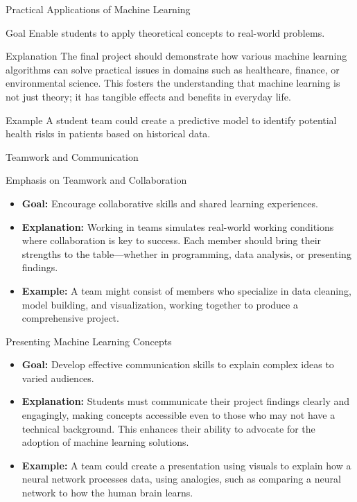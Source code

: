 \documentclass[aspectratio=169]{beamer}
\begin{document}
\begin{frame}[fragile]{Practical Applications of Machine Learning}
    \begin{block}{Goal}
        Enable students to apply theoretical concepts to real-world problems.
    \end{block}
    \begin{block}{Explanation}
        The final project should demonstrate how various machine learning algorithms can solve practical issues in domains such as healthcare, finance, or environmental science. 
        This fosters the understanding that machine learning is not just theory; it has tangible effects and benefits in everyday life.
    \end{block}
    \begin{block}{Example}
        A student team could create a predictive model to identify potential health risks in patients based on historical data.
    \end{block}
\end{frame}

\begin{frame}[fragile]{Teamwork and Communication}
    \begin{block}{Emphasis on Teamwork and Collaboration}
        \begin{itemize}
            \item \textbf{Goal:} Encourage collaborative skills and shared learning experiences.
            \item \textbf{Explanation:} Working in teams simulates real-world working conditions where collaboration is key to success. Each member should bring their strengths to the table—whether in programming, data analysis, or presenting findings.
            \item \textbf{Example:} A team might consist of members who specialize in data cleaning, model building, and visualization, working together to produce a comprehensive project.
        \end{itemize}
    \end{block}
    
    \begin{block}{Presenting Machine Learning Concepts}
        \begin{itemize}
            \item \textbf{Goal:} Develop effective communication skills to explain complex ideas to varied audiences.
            \item \textbf{Explanation:} Students must communicate their project findings clearly and engagingly, making concepts accessible even to those who may not have a technical background. This enhances their ability to advocate for the adoption of machine learning solutions.
            \item \textbf{Example:} A team could create a presentation using visuals to explain how a neural network processes data, using analogies, such as comparing a neural network to how the human brain learns.
        \end{itemize}
    \end{block}
\end{frame}
\end{document}
